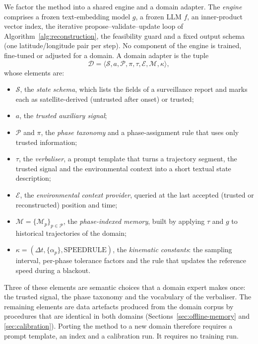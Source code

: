 We factor the method into a shared engine and a domain adapter. The
\emph{engine} comprises a frozen text-embedding model $g$, a frozen LLM $f$,
an inner-product vector index, the iterative propose--validate--update loop
of Algorithm~\ref{alg:reconstruction}, the feasibility guard and a fixed
output schema (one latitude/longitude pair per step). No component of the
engine is trained, fine-tuned or adjusted for a domain. A domain adapter is
the tuple
\begin{equation}
\mathcal{D} = \langle \mathcal{S}, a, \mathcal{P}, \pi, \tau, \mathcal{E}, \mathcal{M}, \kappa \rangle,
\label{eq:adapter}
\end{equation}
whose elements are:
\begin{itemize}
\item $\mathcal{S}$, the \emph{state schema}, which lists the fields of a
surveillance report and marks each as satellite-derived (untrusted after
onset) or trusted;
\item $a$, the \emph{trusted auxiliary signal};
\item $\mathcal{P}$ and $\pi$, the \emph{phase taxonomy} and a
phase-assignment rule that uses only trusted information;
\item $\tau$, the \emph{verbaliser}, a prompt template that turns a
trajectory segment, the trusted signal and the environmental context into a
short textual state description;
\item $\mathcal{E}$, the \emph{environmental context provider}, queried at
the last accepted (trusted or reconstructed) position and time;
\item $\mathcal{M} = \{\mathcal{M}_p\}_{p \in \mathcal{P}}$, the
\emph{phase-indexed memory}, built by applying $\tau$ and $g$ to historical
trajectories of the domain;
\item $\kappa = (\Delta t, \{\alpha_p\}, \mathrm{SPEEDRULE})$, the
\emph{kinematic constants}: the sampling interval, per-phase tolerance
factors and the rule that updates the reference speed during a blackout.
\end{itemize}
Three of these elements are semantic choices that a domain expert makes
once: the trusted signal, the phase taxonomy and the vocabulary of the
verbaliser. The remaining elements are data artefacts produced from the
domain corpus by procedures that are identical in both domains
(Sections~\ref{sec:offline-memory} and \ref{sec:calibration}). Porting the
method to a new domain therefore requires a prompt template, an index and a
calibration run. It requires no training run.

